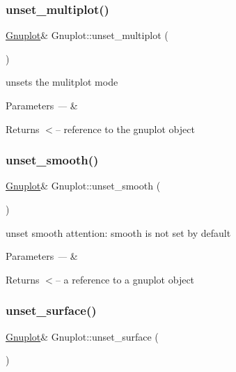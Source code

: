 \subsubsection{\texorpdfstring{unset\+\_\+multiplot()}{unset\_multiplot()}}
{\footnotesize\ttfamily \hyperlink{classGnuplot}{Gnuplot}\& Gnuplot\+::unset\+\_\+multiplot (\begin{DoxyParamCaption}{ }\end{DoxyParamCaption})\hspace{0.3cm}{\ttfamily [inline]}}

unsets the mulitplot mode


\begin{DoxyParams}{Parameters}
{\em ---} & \\
\hline
\end{DoxyParams}
\begin{DoxyReturn}{Returns}
$<$-- reference to the gnuplot object 
\end{DoxyReturn}
\mbox{\label{classGnuplot_ad9dfbccd66dece1dbe5803605c6ab08c}} 
\subsubsection{\texorpdfstring{unset\+\_\+smooth()}{unset\_smooth()}}
{\footnotesize\ttfamily \hyperlink{classGnuplot}{Gnuplot}\& Gnuplot\+::unset\+\_\+smooth (\begin{DoxyParamCaption}{ }\end{DoxyParamCaption})\hspace{0.3cm}{\ttfamily [inline]}}



unset smooth attention\+: smooth is not set by default 


\begin{DoxyParams}{Parameters}
{\em ---} & \\
\hline
\end{DoxyParams}
\begin{DoxyReturn}{Returns}
$<$-- a reference to a gnuplot object 
\end{DoxyReturn}
\mbox{\label{classGnuplot_a4ebddacbec61aa3e7bc4b89f508ad621}} 
\subsubsection{\texorpdfstring{unset\+\_\+surface()}{unset\_surface()}}
{\footnotesize\ttfamily \hyperlink{classGnuplot}{Gnuplot}\& Gnuplot\+::unset\+\_\+surface (\begin{DoxyParamCaption}{ }\end{DoxyParamCaption})\hspace{0.3cm}{\ttfamily [inline]}}

